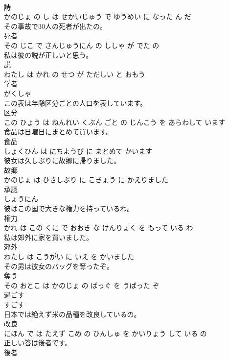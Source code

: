 \documentclass[8pt]{extreport}
\begin{document}
\begin{CJK}{UTF8}{min}
\\	詩 
\\	かのじょ の し は せかいじゅう で ゆうめい に なった ん だ			
\\	その事故で30人の死者が出たの。	
\\	死者 
\\	その じこ で さんじゅうにん の ししゃ が でた の			
\\	私は彼の説が正しいと思う。	
\\	説 
\\	わたし は かれ の せつ が ただしい と おもう			
\\	学者	
\\	がくしゃ			
\\	この表は年齢区分ごとの人口を表しています。	
\\	区分 
\\	この ひょう は ねんれい くぶん ごと の じんこう を あらわして います			
\\	食品は日曜日にまとめて買います。	
\\	食品 
\\	しょくひん は にちようび に まとめて かいます			
\\	彼女は久しぶりに故郷に帰りました。	
\\	故郷 
\\	かのじょ は ひさしぶり に こきょう に かえりました			
\\	承認	
\\	しょうにん			
\\	彼はこの国で大きな権力を持っているわ。	
\\	権力 
\\	かれ は この くに で おおき な けんりょく を もって いる わ			
\\	私は郊外に家を買いました。	
\\	郊外 
\\	わたし は こうがい に いえ を かいました			
\\	その男は彼女のバッグを奪ったぞ。	
\\	奪う 
\\	その おとこ は かのじょ の ばっぐ を うばった ぞ			
\\	過ごす	
\\	すごす			
\\	日本では絶えず米の品種を改良しているの。	
\\	改良 
\\	にほん で は たえず こめ の ひんしゅ を かいりょう して いる の			
\\	正しい答は後者です。	
\\	後者 

\end{CJK}
\end{document}
